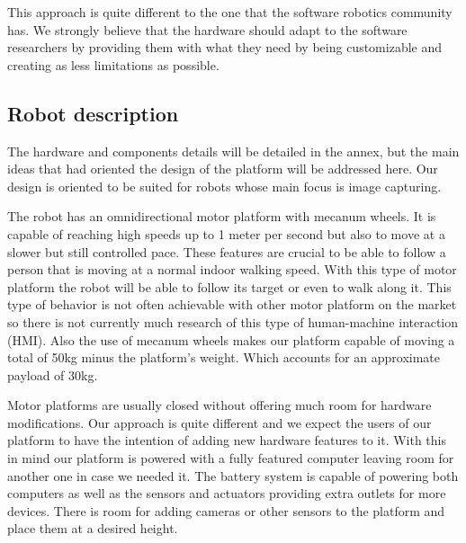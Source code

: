 This approach is quite different to the one that the software robotics community has.
We strongly believe that the hardware should adapt to the software researchers by providing them with what they need by being customizable and creating as less limitations as possible.

%
\subsection{Robot description}
The hardware and components details will be detailed in the annex, but the main ideas that had oriented the design of the platform will be addressed here.
Our design is oriented to be suited for robots whose main focus is image capturing.

The robot has an omnidirectional motor platform with mecanum wheels.
It is capable of reaching high speeds up to 1 meter per second but also to move at a slower but still controlled pace.
These features are crucial to be able to follow a person that is moving at a normal indoor walking speed.
With this type of motor platform the robot will be able to follow its target or even to walk along it.
This type of behavior is not often achievable with other motor platform on the market so there is not currently much research of this type of human-machine interaction (HMI).
Also the use of mecanum wheels makes our platform capable of moving a total of 50kg minus the platform's weight.
Which accounts for an approximate payload of 30kg.

Motor platforms are usually closed without offering much room for hardware modifications.
Our approach is quite different and we expect the users of our platform to have the intention of adding new hardware features to it.
With this in mind our platform is powered with a fully featured computer leaving room for another one in case we needed it.
The battery system is capable of powering both computers as well as the sensors and actuators providing extra outlets for more devices.
There is room for adding cameras or other sensors to the platform and place them at a desired height.

